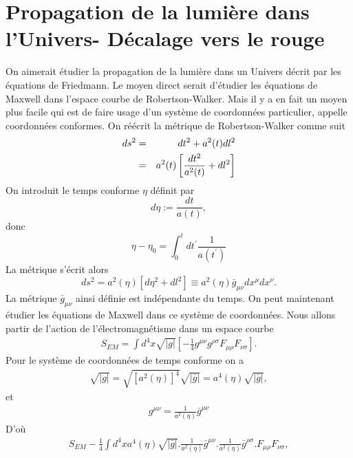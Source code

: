 \documentclass[a4paper,12pt]{report}
\theoremstyle{plain}
\theoremstyle{plain}
\begin{document}
  \section{Propagation de la lumi\`ere dans l'Univers- D\'ecalage vers le rouge}  
  On aimerait \'etudier la propagation de la lumi\`ere dans un Univers d\'ecrit par les \'equations de Friedmann. Le moyen direct serait d'\'etudier les \'equations de Maxwell dans l'espace courbe de Robertson-Walker. Mais il y a en fait un moyen plus facile qui est de faire usage d'un syst\`eme de coordonn\'ees particulier, appelle coordonn\'ees conformes. On r\'e\'ecrit la m\'etrique de Robertson-Walker comme suit 
  \begin{eqnarray}
  ds^2 & =& dt^2 + a^2(t) dl^2 \cr
  &= &a^2(t) \left[ \frac{dt^2}{a^2(t)} +dl^2 \right]   
  \end{eqnarray} 
  On introduit le temps conforme $\eta $ d\'efinit par 
  \begin{equation}
  d\eta := \frac{dt}{a(t)},
  \end{equation} 
  donc 
  \begin{equation}
  \eta - \eta_0 = \int_{0}^{t} dt^\prime \frac{1}{a(t^\prime)} 
  \end{equation}
  La m\'etrique s'\'ecrit alors 
  \begin{equation}
  ds^2 = a^2(\eta) \left[ d\eta ^2 +dl^2 \right] \equiv a^2(\eta) \bar{g}_{\mu \nu } dx^\mu dx^ \nu.
  \end{equation}
  La m\'etrique $\bar{g}_{\mu \nu} $ ainsi d\'efinie est ind\'ependante du temps. On peut maintenant \'etudier les \'equations de Maxwell dans ce syst\`eme de coordonn\'ees. Nous allons partir de l'action de l'\'electromagn\'etisme dans un espace courbe 
  \begin{eqnarray}
  S_{EM} = \displaystyle \int d^4 x \sqrt{|g|}
  \left[ - \frac{1}{4} g^{\mu \nu } g^{\rho \sigma } F_{\mu  \rho } F_{\nu \sigma } \right]. 
  \end{eqnarray}
  Pour le syst\`eme de coordonn\'ees de temps conforme on a 
  \begin{eqnarray}
   \sqrt{|g|} = \sqrt{\left[ a^2(\eta) \right]^4  } \sqrt{|\bar{g}|} =a^4 (\eta ) \sqrt{|\bar{g}|}, 
   \end{eqnarray}
   et 
   \begin{eqnarray}
   g^{\mu \nu } = \frac{1}{a^2(\eta )} \bar{g}^{\mu \nu } 
   \end{eqnarray}  
   D'o\`{u} 
   \begin{eqnarray}
   S_{EM} - \frac{1}{4} \displaystyle \int d^4x a^4(\eta) \sqrt{|\bar{g}|}. \frac{1}{a^2(\eta)} \bar{g}^{\mu \nu} . \frac{1}{a^2(\eta)} \bar{g}^{\rho \sigma } . F_{\mu \rho } F_{\nu \sigma}, 
   \end{eqnarray}
\end{document}

